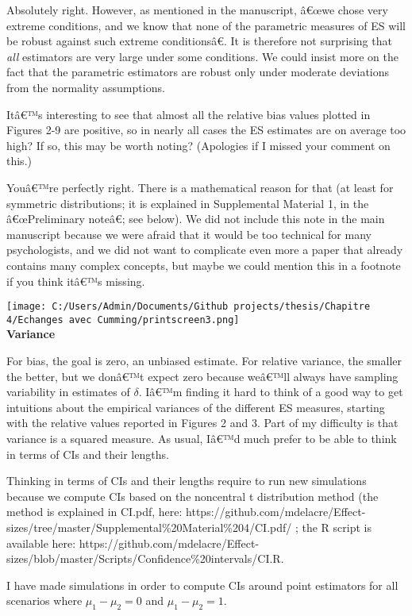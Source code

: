 \begin{appendix}
\color{blue} Absolutely right. However, as mentioned in the manuscript,
â€œwe chose very extreme conditions, and we know that none of the
parametric measures of ES will be robust against such extreme
conditionsâ€. It is therefore not surprising that \emph{all} estimators
are very large under some conditions. We could insist more on the fact
that the parametric estimators are robust only under moderate deviations
from the normality assumptions.

\color{black} Itâ€™s interesting to see that almost all the relative
bias values plotted in Figures 2-9 are positive, so in nearly all cases
the ES estimates are on average too high? If so, this may be worth
noting? (Apologies if I missed your comment on this.)

\color{blue} Youâ€™re perfectly right. There is a mathematical reason
for that (at least for symmetric distributions; it is explained in
Supplemental Material 1, in the â€œPreliminary noteâ€; see below). We
did not include this note in the main manuscript because we were afraid
that it would be too technical for many psychologists, and we did not
want to complicate even more a paper that already contains many complex
concepts, but maybe we could mention this in a footnote if you think
itâ€™s missing.

\texttt{[image: C:/Users/Admin/Documents/Github projects/thesis/Chapitre 4/Echanges avec Cumming/printscreen3.png]}\\
\color{black} \textbf{Variance}

For bias, the goal is zero, an unbiased estimate. For relative variance,
the smaller the better, but we donâ€™t expect zero because weâ€™ll
always have sampling variability in estimates of \(\delta\). Iâ€™m
finding it hard to think of a good way to get intuitions about the
empirical variances of the different ES measures, starting with the
relative values reported in Figures 2 and 3. Part of my difficulty is
that variance is a squared measure. As usual, Iâ€™d much prefer to be
able to think in terms of CIs and their lengths.

\color{blue} Thinking in terms of CIs and their lengths require to run
new simulations because we compute CIs based on the noncentral t
distribution method (the method is explained in CI.pdf, here:
https://github.com/mdelacre/Effect-sizes/tree/master/Supplemental\%20Material\%204/CI.pdf/
; the R script is available here:
https://github.com/mdelacre/Effect-sizes/blob/master/Scripts/Confidence\%20intervals/CI.R.

I have made simulations in order to compute CIs around point estimators
for all scenarios where \(\mu_1-\mu_2 = 0\) and \(\mu_1-\mu_2 = 1\).


\end{appendix}
